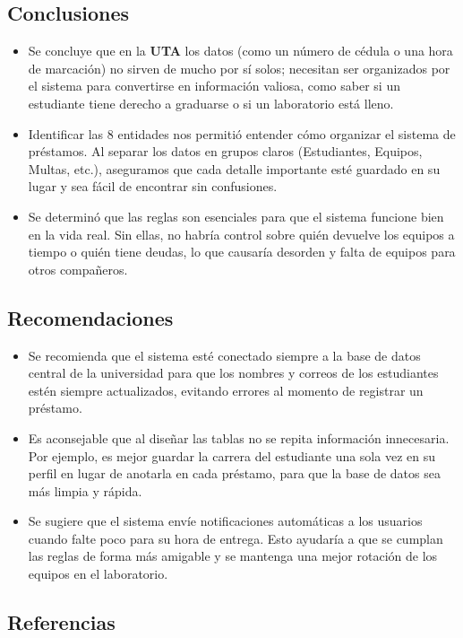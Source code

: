 \documentclass{article}
\begin{document}
\subsection{Conclusiones}
\begin{itemize}
    \item Se concluye que en la \textbf{UTA} los datos (como un número de cédula o una hora de marcación) no sirven de mucho por sí solos; necesitan ser organizados por el sistema para convertirse en información valiosa, como saber si un estudiante tiene derecho a graduarse o si un laboratorio está lleno.
    
    \item Identificar las 8 entidades nos permitió entender cómo organizar el sistema de préstamos. Al separar los datos en grupos claros (Estudiantes, Equipos, Multas, etc.), aseguramos que cada detalle importante esté guardado en su lugar y sea fácil de encontrar sin confusiones.
    
    \item Se determinó que las reglas son esenciales para que el sistema funcione bien en la vida real. Sin ellas, no habría control sobre quién devuelve los equipos a tiempo o quién tiene deudas, lo que causaría desorden y falta de equipos para otros compañeros.
\end{itemize}

\subsection{Recomendaciones}
\begin{itemize}
    \item Se recomienda que el sistema esté conectado siempre a la base de datos central de la universidad para que los nombres y correos de los estudiantes estén siempre actualizados, evitando errores al momento de registrar un préstamo.
    
    \item Es aconsejable que al diseñar las tablas no se repita información innecesaria. Por ejemplo, es mejor guardar la carrera del estudiante una sola vez en su perfil en lugar de anotarla en cada préstamo, para que la base de datos sea más limpia y rápida.
    
    \item Se sugiere que el sistema envíe notificaciones automáticas a los usuarios cuando falte poco para su hora de entrega. Esto ayudaría a que se cumplan las reglas de forma más amigable y se mantenga una mejor rotación de los equipos en el laboratorio.
\end{itemize}
\subsection{Referencias}
\vspace{-3em}
\renewcommand{\refname}{}
\nocite{*}



\vfill
\end{document}
